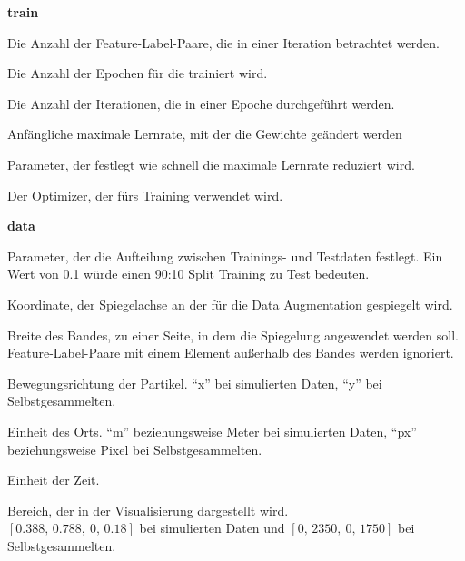 \bigskip
{\Large \sffamily \textbf{train}}

\begin{description}[leftmargin=!,labelwidth=\widthof{\bfseries separatorPosition}, labelindent=0.5cm]
    \item[batchSize] Die Anzahl der Feature-Label-Paare, die in einer Iteration betrachtet werden.
    \item[epochs] Die Anzahl der Epochen für die trainiert wird.
    \item[stepsPerEpoch] Die Anzahl der Iterationen, die in einer Epoche durchgeführt werden.  
    \item[learningRate] Anfängliche maximale Lernrate, mit der die Gewichte geändert werden
    \item[decaySteps] Parameter, der festlegt wie schnell die maximale Lernrate reduziert wird. 
    \item[optimizer] Der Optimizer, der fürs Training verwendet wird.
\end{description}

\bigskip
{\Large \sffamily \textbf{data}}
\begin{description}[leftmargin=!,labelwidth=\widthof{\bfseries separatorPosition}, labelindent=0.5cm]
    \item[testSize] Parameter, der die Aufteilung zwischen Trainings- und Testdaten festlegt. Ein Wert von 0.1 würde einen 90:10 Split Training zu Test bedeuten.  
    \item[augmentMidpoint] Koordinate, der Spiegelachse an der für die Data Augmentation gespiegelt wird.
    \item[augmentRange] Breite des Bandes, zu einer Seite, in dem die Spiegelung angewendet werden soll. Feature-Label-Paare mit einem Element außerhalb des Bandes werden ignoriert.
    \item[direction] Bewegungsrichtung der Partikel. ``x'' bei simulierten Daten, ``y'' bei Selbstgesammelten.
    \item[unitLoc] Einheit des Orts. ``m'' beziehungsweise Meter bei simulierten Daten, ``px'' beziehungsweise Pixel bei Selbstgesammelten.
    \item[unitTime] Einheit der Zeit. 
    \item[limits] Bereich, der in der Visualisierung dargestellt wird.\\ \([0.388, \, 0.788, \ 0, \, 0.18]\) bei simulierten Daten und \([0,\, 2350, \ 0, \, 1750]\) bei Selbstgesammelten.

\end{description}



